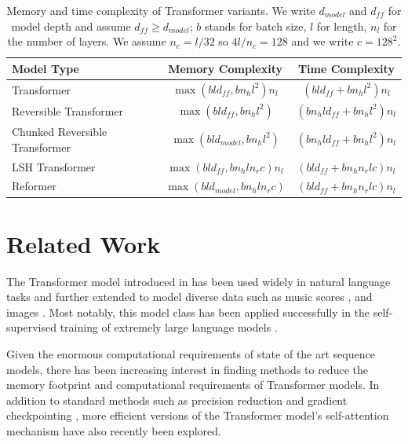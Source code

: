\documentclass{article} %
\begin{document}
\begin{table}
\caption{Memory and time complexity of Transformer variants.
  We write $d_{model}$ and $d_{ff}$ for model depth and assume $d_{ff} \geq d_{model}$; $b$ stands for batch size, $l$ for length, $n_l$ for the number of layers.
  We assume $n_{c} = l/32$ so $4l/n_{c} = 128$ and we write $c = 128^2$.}
\label{tab:tcomplexity}
\begin{center}
\begin{tabular}{lcc}
Model Type & Memory Complexity & Time Complexity  \\
\hline
Transformer & $\max(bld_{ff}, bn_hl^2)n_l$ & $(bld_{ff} + bn_hl^2)n_l$ \\
Reversible Transformer & $\max(bld_{ff}, bn_hl^2)$ & $(bn_hld_{ff} + bn_hl^2)n_l$ \\
Chunked Reversible Transformer & $\max(bld_{model}, bn_hl^2)$ & $(bn_hld_{ff} + bn_hl^2)n_l$ \\
LSH Transformer & $\max(bld_{ff}, bn_hln_rc)n_l$ & $(bld_{ff} + bn_hn_rlc)n_l$ \\
Reformer & $\max(bld_{model}, bn_hln_rc)$ & $(bld_{ff} + bn_hn_rlc)n_l$ \\

\end{tabular}
\end{center}
\end{table}

\section{Related Work} \label{sec:relwork}

The Transformer model introduced in \citep{transformer} has been used
widely in natural language tasks and further extended to model diverse data such as music scores \citep{huang2018music}, 
and images \citep{parmar2018imagetransformer, ramachandran2019attentionimage}.  Most notably, this model class 
has been applied successfully in the self-supervised training of extremely large language models
\citep{devlin2018BERT, radford2019GPT2}.

Given the enormous computational requirements of state of the art sequence models, 
there has been increasing interest in finding methods to reduce the memory footprint and computational 
requirements of Transformer models.  In addition to standard methods such as precision reduction and gradient checkpointing \citep{sohoni2019lowmemory}, more efficient versions of the Transformer model's self-attention mechanism \citep{sukhbaatar2019adaptiveattn, sukhbaatar2019persistentmemory} have also recently been explored.
\end{document}
